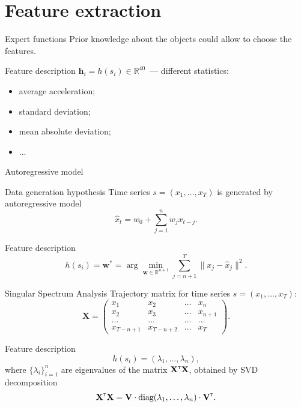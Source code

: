 \documentclass{beamer}
\newcommand{\T}{{\text{\tiny\sffamily\upshape\mdseries T}}}
\begin{document}
\section{Feature extraction}
\begin{frame}{Expert functions}
	Prior knowledge about the objects could allow to choose the features.
	\begin{block}{Feature description}
		$\mathbf{h}_i = h(s_i)\in \mathbb{R}^{40}$~--- different statistics:
		\begin{itemize}
			\item average acceleration;
			\item standard deviation;
			\item mean absolute deviation;
			\item ...
		\end{itemize}
	\end{block}

\end{frame}
\begin{frame}{Autoregressive model}
	\begin{block}{Data generation hypothesis}
		Time series $s = (x_1, \dots, x_T)$ is generated by autoregressive model
		\[
			\hat{x}_t = w_0 + \sum_{j=1}^n w_j x_{t-j}.
		\]
	\end{block}
	
	\begin{block}{Feature description}
		\[
			h(s_i) = \mathbf{w}^* = \arg \min_{\mathbf{w} \in \mathbb{R}^{n+1}} \sum_{j=n+1}^{T} \| x_j - \hat{x}_j \|^2.
		\]
	\end{block}
\end{frame}
\begin{frame}{Singular Spectrum Analysis}
	Trajectory matrix for time series $s = (x_1, \dots, x_T)$:
	\[
		\mathbf{X} = 
		\begin{pmatrix}
			x_1 & x_2 & \dots & x_n \\
			x_2 & x_3 & \dots & x_{n+1} \\
			\dots & \dots & \dots & \dots\\
			x_{T-n+1} & x_{T-n+2} & \dots & x_{T}
		\end{pmatrix}.
	\]
	
	\begin{block}{Feature description}
		\[
			h(s_i) = (\lambda_1, \dots ,\lambda_n),
		\]
		where $\{\lambda_i\}_{i=1}^n$ are eigenvalues of the matrix $\mathbf{X}^{\T} \mathbf{X}$, obtained by SVD decomposition
		\[
			\mathbf{X}^{\T} \mathbf{X} = \mathbf{V} \cdot \text{diag} (\lambda_1, \dots, \lambda_n) \cdot \mathbf{V}^{\T}.
		\]
	\end{block}

\end{frame}
\end{document}
